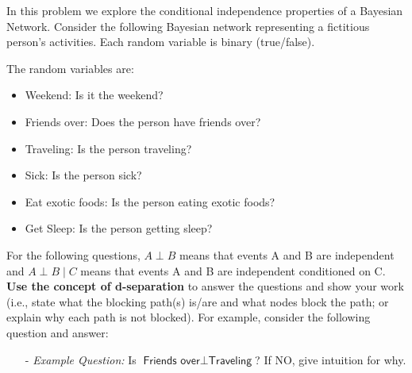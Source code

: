\documentclass[submit]{../harvardml}
\newcommand{\attr}[1]{\textsf{#1}}
\begin{document}
\begin{problem}
  In this problem we explore the conditional independence
  properties of a Bayesian Network.  Consider the following Bayesian
  network representing a fictitious person's activities. Each random
  variable is binary (true/false).

  \begin{center}
  \end{center}

  The random variables are:

  \begin{itemize}
  \item \attr{Weekend}: Is it the weekend?
  \item \attr{Friends over}: Does the person have friends over?
  \item \attr{Traveling}: Is the person traveling?
  \item \attr{Sick}: Is the person sick?
  \item \attr{Eat exotic foods}: Is the person eating exotic foods?
  \item \attr{Get Sleep}: Is the person getting sleep?
  \end{itemize}

  \medskip

  \noindent For the following questions, $A \perp B$ means that events A and B are independent and $A \perp B\mid C$ means that events A and B are independent conditioned on C. \\

  \noindent \textbf{Use the concept of d-separation} to answer the
  questions and show your work (i.e., state what the blocking path(s) is/are and what nodes block the path; or explain why each path is not blocked). For example, consider the following question and answer:
  \begin{itemize}
    \item[-] \textit{Example Question:} Is $\attr{Friends over} \perp \attr{Traveling}$? If NO, give intuition for why.
  

\end{itemize}
\end{problem}
\end{document}
